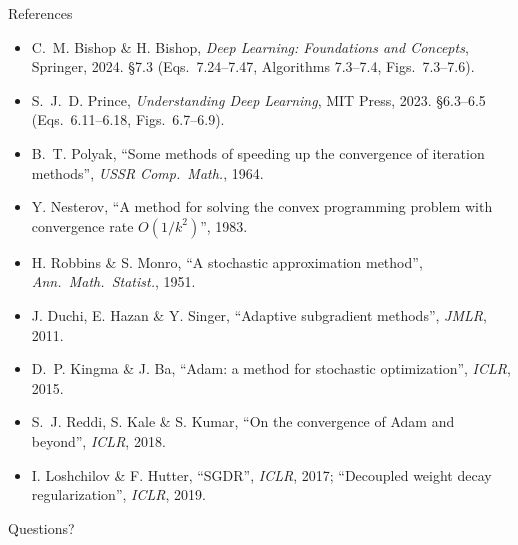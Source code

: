 \documentclass[aspectratio=169, 11pt]{beamer}
\begin{document}
\begin{frame}{References}
  \vspace{0.2em}
  {\scriptsize
  \begin{itemize}\itemsep0.26em
    \item C.~M. Bishop \& H. Bishop, \emph{Deep Learning: Foundations
          and Concepts}, Springer, 2024. \S7.3 (Eqs.~7.24--7.47,
          Algorithms 7.3--7.4, Figs.~7.3--7.6).
    \item S.~J.~D. Prince, \emph{Understanding Deep Learning}, MIT
          Press, 2023. \S6.3--6.5 (Eqs.~6.11--6.18, Figs.~6.7--6.9).
    \item B.~T. Polyak, ``Some methods of speeding up the convergence of
          iteration methods'', \emph{USSR Comp.~Math.}, 1964.
    \item Y. Nesterov, ``A method for solving the convex programming
          problem with convergence rate $O(1/k^2)$'', 1983.
    \item H. Robbins \& S. Monro, ``A stochastic approximation method'',
          \emph{Ann.~Math.~Statist.}, 1951.
    \item J. Duchi, E. Hazan \& Y. Singer, ``Adaptive subgradient
          methods'', \emph{JMLR}, 2011.
    \item D.~P. Kingma \& J. Ba, ``Adam: a method for stochastic
          optimization'', \emph{ICLR}, 2015.
    \item S.~J. Reddi, S. Kale \& S. Kumar, ``On the convergence of Adam
          and beyond'', \emph{ICLR}, 2018.
    \item I. Loshchilov \& F. Hutter, ``SGDR'', \emph{ICLR}, 2017;
          ``Decoupled weight decay regularization'', \emph{ICLR}, 2019.
  \end{itemize}}
\end{frame}

\begin{frame}[standout]
  Questions?
\end{frame}
\end{document}
